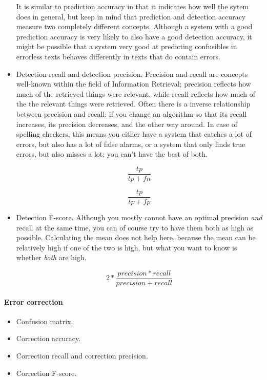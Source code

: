\documentclass[12pt]{article}
\begin{document}
\begin{itemize}
It is similar to prediction accuracy in that it indicates how well the sytem does in general, but keep in mind that prediction and detection accuracy measure two completely different concepts. Although a system with a good prediction accuracy is very likely to also have a good detection accuracy, it might be possible that a system very good at predicting confusibles in errorless texts behaves differently in texts that do contain errors.
 
\item Detection recall and detection precision. 
Precision and recall are concepts well-known within the field of Information Retrieval; precision reflects how much of the retrieved things were relevant, while recall reflects how much of the the relevant things were retrieved. Often there is a inverse relationship between precision and recall: if you change an algorithm so that its recall increases, its precision decreases, and the other way around. In case of spelling checkers, this means you either have a system that catches a lot of errors, but also has a lot of false alarms, or a system that only finds true errors, but also misses a lot; you can't have the best of both.

\[
\frac{tp}{tp+fn}
\]

\[
\frac{tp}{tp+fp}
\]

\item Detection F-score. 
Although you mostly cannot have an optimal precision \emph{and} recall at the same time, you can of course try to have them both as high as possible. Calculating the mean does not help here, because the mean can be relatively high if one of the two is high, but what you want to know is whether \emph{both} are high.

\[
2 * \frac{precision * recall}{precision + recall}
\]

\end{itemize}

\paragraph{Error correction}

\begin{itemize}
\item Confusion matrix.
\item Correction accuracy.
\item Correction recall and correction precision.
\item Correction F-score.
\end{itemize}
\end{document}
